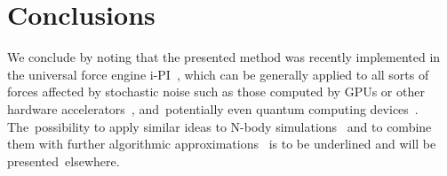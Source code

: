\documentclass[computation,article,accept,moreauthors,pdftex]{Definitions/mdpi}
\begin{document}
\section{Conclusions}
\label{sec:conclusion}
We conclude by noting that the presented method was recently implemented in the universal force engine i-PI~\cite{iPi}, which can be generally applied to all sorts of forces affected by stochastic noise such as those computed by GPUs or other hardware accelerators~\cite{HOOMD, NAMD, OpenMM, HalMD, Lammps, Amber, Gromacs}, and~potentially even quantum computing devices~\cite{Steane, Knill, Blatt, Chow}. The~possibility to apply similar ideas to N-body simulations~\cite{White, Makino} and to combine them with further algorithmic approximations~\cite{LassAC} is to be underlined and will be presented~elsewhere.

\vspace{6pt} 

\end{document}
